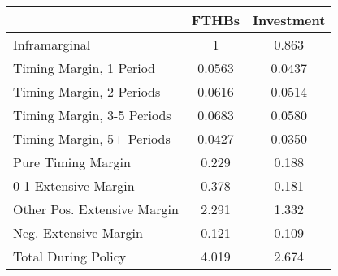 \begin{tabular}{l*{2}{c}}
\hline\hline
            &       FTHBs&  Investment\\
\hline
Inframarginal&           1&       0.863\\
\midrule
Timing Margin, 1 Period&      0.0563&      0.0437\\
Timing Margin, 2 Periods&      0.0616&      0.0514\\
Timing Margin, 3-5 Periods&      0.0683&      0.0580\\
Timing Margin, 5+ Periods&      0.0427&      0.0350\\
Pure Timing Margin&         0.229    &  0.188\\
\midrule
0-1 Extensive Margin&       0.378&       0.181\\
Other Pos. Extensive Margin&       2.291&       1.332\\
Neg. Extensive Margin&       0.121&       0.109\\
Total During Policy       &       4.019&       2.674\\
\hline\hline
\end{tabular}
